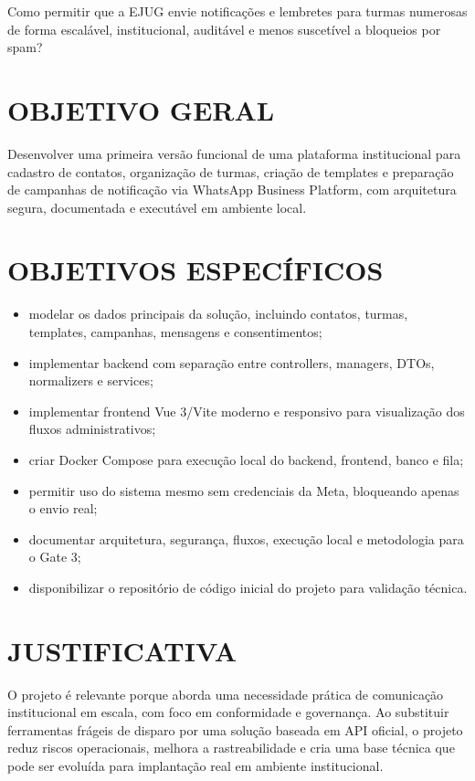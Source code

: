 \documentclass[12pt,letterpaper,oneside]{report}
\begin{document}
Como permitir que a EJUG envie notificações e lembretes para turmas numerosas de forma escalável, institucional, auditável e menos suscetível a bloqueios por spam?

\section{OBJETIVO GERAL}

Desenvolver uma primeira versão funcional de uma plataforma institucional para cadastro de contatos, organização de turmas, criação de templates e preparação de campanhas de notificação via WhatsApp Business Platform, com arquitetura segura, documentada e executável em ambiente local.

\section{OBJETIVOS ESPECÍFICOS}

\begin{itemize}
  \item modelar os dados principais da solução, incluindo contatos, turmas, templates, campanhas, mensagens e consentimentos;
  \item implementar backend com separação entre controllers, managers, DTOs, normalizers e services;
  \item implementar frontend Vue 3/Vite moderno e responsivo para visualização dos fluxos administrativos;
  \item criar Docker Compose para execução local do backend, frontend, banco e fila;
  \item permitir uso do sistema mesmo sem credenciais da Meta, bloqueando apenas o envio real;
  \item documentar arquitetura, segurança, fluxos, execução local e metodologia para o Gate 3;
  \item disponibilizar o repositório de código inicial do projeto para validação técnica.
\end{itemize}

\section{JUSTIFICATIVA}

O projeto é relevante porque aborda uma necessidade prática de comunicação institucional em escala, com foco em conformidade e governança. Ao substituir ferramentas frágeis de disparo por uma solução baseada em API oficial, o projeto reduz riscos operacionais, melhora a rastreabilidade e cria uma base técnica que pode ser evoluída para implantação real em ambiente institucional.
\end{document}
